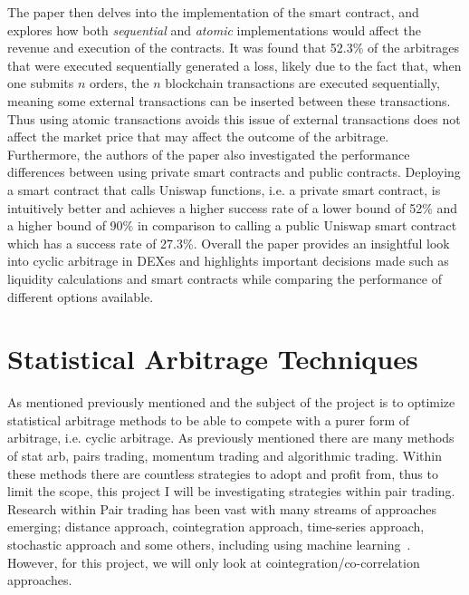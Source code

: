 \noindent The paper then delves into the implementation of the smart contract, and explores how both \textit{sequential} and \textit{atomic} implementations would affect the revenue and execution of the contracts. It was found that 52.3\% of the arbitrages that were executed sequentially generated a loss, likely due to the fact that, when one submits $n$ orders, the $n$ blockchain transactions are executed sequentially, meaning some external transactions can be inserted between these transactions. Thus using atomic transactions avoids this issue of external transactions does not affect the market price that may affect the outcome of the arbitrage.
\\[5mm]
Furthermore, the authors of the paper also investigated the performance differences between using private smart contracts and public contracts. Deploying a smart contract that calls Uniswap functions, i.e. a private smart contract, is intuitively better and achieves a higher success rate of a lower bound of 52\% and a higher bound of 90\% in comparison to calling a public Uniswap smart contract which has a success rate of 27.3\%. Overall the paper provides an insightful look into cyclic arbitrage in DEXes and highlights important decisions made such as liquidity calculations and smart contracts while comparing the performance of different options available.

\section{Statistical Arbitrage Techniques}
As mentioned previously mentioned and the subject of the project is to optimize statistical arbitrage methods to be able to compete with a purer form of arbitrage, i.e. cyclic arbitrage. As previously mentioned there are many methods of stat arb, pairs trading, momentum trading and algorithmic trading. Within these methods there are countless strategies to adopt and profit from, thus to limit the scope, this project I will be investigating strategies within pair trading. Research within Pair trading has been vast with many streams of approaches emerging; distance approach, cointegration approach, time-series approach, stochastic approach and some others, including using machine learning~\cite{https://doi.org/10.1111/joes.12153}. However, for this project, we will only look at cointegration/co-correlation approaches.

